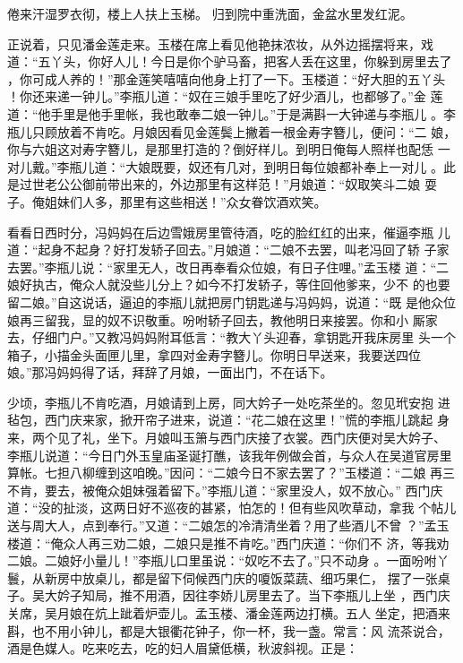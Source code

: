 倦来汗湿罗衣彻，楼上人扶上玉梯。
归到院中重洗面，金盆水里发红泥。

正说着，只见潘金莲走来。玉楼在席上看见他艳抹浓妆，从外边摇摆将来，戏
道：“五丫头，你好人儿！今日是你个驴马畜，把客人丢在这里，你躲到房里去了
，你可成人养的！”那金莲笑嘻嘻向他身上打了一下。玉楼道：“好大胆的五丫头
！你还来递一钟儿。”李瓶儿道：“奴在三娘手里吃了好少酒儿，也都够了。”金
莲道：“他手里是他手里帐，我也敢奉二娘一钟儿。”于是满斟一大钟递与李瓶儿
。李瓶儿只顾放着不肯吃。月娘因看见金莲鬓上撇着一根金寿字簪儿，便问：“二
娘，你与六姐这对寿字簪儿，是那里打造的？倒好样儿。到明日俺每人照样也配恁
一对儿戴。”李瓶儿道：“大娘既要，奴还有几对，到明日每位娘都补奉上一对儿
。此是过世老公公御前带出来的，外边那里有这样范！”月娘道：“奴取笑斗二娘
耍子。俺姐妹们人多，那里有这些相送！”众女眷饮酒欢笑。

看看日西时分，冯妈妈在后边雪娥房里管待酒，吃的脸红红的出来，催逼李瓶
儿道：“起身不起身？好打发轿子回去。”月娘道：“二娘不去罢，叫老冯回了轿
子家去罢。”李瓶儿说：“家里无人，改日再奉看众位娘，有日子住哩。”孟玉楼
道：“二娘好执古，俺众人就没些儿分上？如今不打发轿子，等住回他爹来，少不
的也要留二娘。”自这说话，逼迫的李瓶儿就把房门钥匙递与冯妈妈，说道：“既
是他众位娘再三留我，显的奴不识敬重。吩咐轿子回去，教他明日来接罢。你和小
厮家去，仔细门户。”又教冯妈妈附耳低言：“教大丫头迎春，拿钥匙开我床房里
头一个箱子，小描金头面匣儿里，拿四对金寿字簪儿。你明日早送来，我要送四位
娘。”那冯妈妈得了话，拜辞了月娘，一面出门，不在话下。

少顷，李瓶儿不肯吃酒，月娘请到上房，同大妗子一处吃茶坐的。忽见玳安抱
进毡包，西门庆来家，掀开帘子进来，说道：“花二娘在这里！”慌的李瓶儿跳起
身来，两个见了礼，坐下。月娘叫玉箫与西门庆接了衣裳。西门庆便对吴大妗子、
李瓶儿说道：“今日门外玉皇庙圣诞打醮，该我年例做会首，与众人在吴道官房里
算帐。七担八柳缠到这咱晚。”因问：“二娘今日不家去罢了？”玉楼道：“二娘
再三不肯，要去，被俺众姐妹强着留下。”李瓶儿道：“家里没人，奴不放心。”
西门庆道：“没的扯淡，这两日好不巡夜的甚紧，怕怎的！但有些风吹草动，拿我
个帖儿送与周大人，点到奉行。”又道：“二娘怎的冷清清坐着？用了些酒儿不曾
？”孟玉楼道：“俺众人再三劝二娘，二娘只是推不肯吃。”西门庆道：“你们不
济，等我劝二娘。二娘好小量儿！”李瓶儿口里虽说：“奴吃不去了。”只不动身
。一面吩咐丫鬟，从新房中放桌儿，都是留下伺候西门庆的嗄饭菜蔬、细巧果仁，
摆了一张桌子。吴大妗子知局，推不用酒，因往李娇儿房里去了。当下李瓶儿上坐
，西门庆关席，吴月娘在炕上跐着炉壶儿。孟玉楼、潘金莲两边打横。五人
坐定，把酒来斟，也不用小钟儿，都是大银衢花钟子，你一杯，我一盏。常言：风
流茶说合，酒是色媒人。吃来吃去，吃的妇人眉黛低横，秋波斜视。正是：

